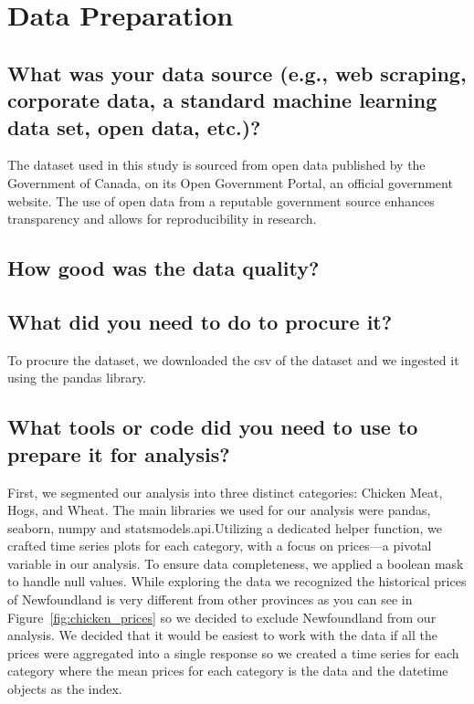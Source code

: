 \section{Data Preparation}

\subsection{What was your data source (e.g., web scraping, corporate data, a standard machine learning data set, open data, etc.)?}

The dataset used in this study is sourced from open data published by the Government of Canada, on its Open Government Portal, an official government website. The use of open data from a reputable government source enhances transparency and allows for reproducibility in research.

\subsection{How good was the data quality?}



\subsection{What did you need to do to procure it?}

To procure the dataset, we downloaded the csv of the dataset and we ingested it using the pandas library.

\subsection{What tools or code did you need to use to prepare it for analysis?}

First, we segmented our analysis into three distinct categories: Chicken Meat, Hogs, and Wheat. The main libraries we used for our analysis were pandas, seaborn, numpy and statsmodels.api.Utilizing a dedicated helper function, we crafted time series plots for each category, with a focus on prices—a pivotal variable in our analysis. To ensure data completeness, we applied a boolean mask to handle null values. While exploring the data we recognized the historical prices of Newfoundland is very different from other provinces as you can see in Figure~\ref{fig:chicken_prices} so we decided to exclude Newfoundland from our analysis. We decided that it would be easiest to work with the data if all the prices were aggregated into a single response so we created a time series for each category where the mean prices for each category is the data and the datetime objects as the index.

